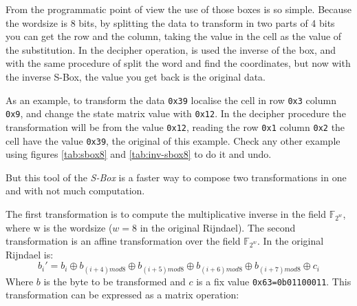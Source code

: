 \documentclass[10pt,a4paper,twoside]{llncs}
\newcommand{\Fpn}[2]{\ensuremath{\mathbb{F}_{#1^#2}}}
\begin{document}
From the programmatic point of view the use of those boxes is so simple. Because the wordsize is 8 bits, by splitting the data to transform in two parts of 4 bits you can get the row and the column, taking the value in the cell as the value of the substitution. In the decipher operation, is used the inverse of the box, and with the same procedure of split the word and find the coordinates, but now with the inverse S-Box, the value you get back is the original data.

As an example, to transform the data \texttt{0x39} localise the cell in row \texttt{0x3} column \texttt{0x9}, and change the state matrix value with \texttt{0x12}. In the decipher procedure the transformation will be from the value \texttt{0x12}, reading the row \texttt{0x1} column \texttt{0x2} the cell have the value \texttt{0x39}, the original of this example. Check any other example using figures \ref{tab:sbox8} and \ref{tab:inv-sbox8} to do it and undo.


But this tool of the \emph{S-Box} is a faster way to compose two transformations in one and with not much computation.

The first transformation is to compute the multiplicative inverse in the field \Fpn{2}{w}, where w is the wordsize ($w=8$ in the original Rijndael). The second transformation is an affine transformation over the field \Fpn{2}{w}. In the original Rijndael is:
\begin{equation}\label{eq:subBytes:affine}
 b_{i}' = b_{i} \oplus b_{(i+4)mod8} \oplus b_{(i+5)mod8} \oplus 
          b_{(i+6)mod8} \oplus b_{(i+7)mod8} \oplus c_{i}
\end{equation}
Where $b$ is the byte to be transformed and $c$ is a fix value \texttt{0x63=0b01100011}. This transformation can be expressed as a matrix operation:
\end{document}
